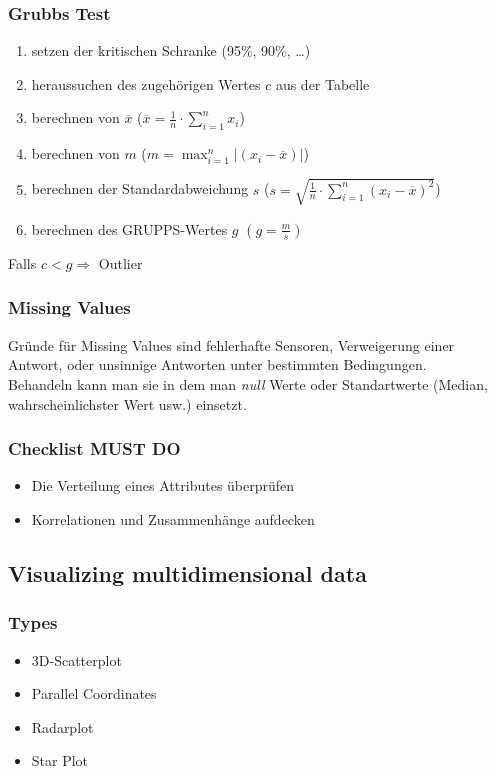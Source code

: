 \documentclass[a4paper]{scrartcl}
\begin{document}
\subsubsection{Grubbs Test}
\begin{enumerate}
	\setlength{\parskip}{-1pt}
	\item setzen der kritischen Schranke (95\%, 90\%, \dots)
	\item heraussuchen des zugehörigen Wertes $c$ aus der Tabelle
	\item berechnen von $\overline{x}$ ($\overline{x}=\frac{1}{n} \cdot \sum\limits_{i=1}^{n} x_i$)
	\item berechnen von $m$ ($m=\max_{i=1}^n |(x_i - \overline{x})|$)
	\item berechnen der Standardabweichung $s$ ($s=\sqrt{\frac{1}{n}\cdot \sum\limits_{i=1}^{n}(x_i-\overline{x})^2}$)
	\item berechnen des GRUPPS-Wertes $g$  $(g=\frac{m}{s})$
\end{enumerate}
Falls $c<g \Rightarrow$ Outlier

\subsubsection{Missing Values}
Gründe für Missing Values sind fehlerhafte Sensoren, Verweigerung einer Antwort, oder unsinnige Antworten unter bestimmten Bedingungen.\\
Behandeln kann man sie in dem man \textit{null} Werte oder Standartwerte (Median, wahrscheinlichster Wert usw.) einsetzt.
\subsubsection{Checklist MUST DO}
\begin{itemize}
\setlength{\parskip}{-1pt}
\item Die Verteilung eines Attributes überprüfen
\item Korrelationen und Zusammenhänge aufdecken
\end{itemize}

\subsection{Visualizing multidimensional data}
\subsubsection{Types}
\begin{itemize}
\setlength{\parskip}{-1pt}
\item 3D-Scatterplot
\item Parallel Coordinates
\item Radarplot
\item Star Plot 
\end{itemize}
\end{document}
